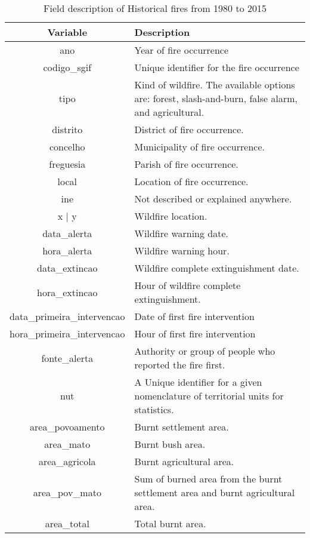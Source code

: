\begin{table}[h!]
\caption{Field description of Historical fires from 1980 to 2015}
\label{forest_inventory}
\centering
\small
\begin{tabular}{|c|p{7.5cm}|} %
\hline
\textbf{Variable} & \textbf{Description}\\
\hline
ano  & Year of fire occurrence \\
\hline
codigo\_sgif & Unique identifier for the fire occurrence \\
\hline
tipo  & Kind of wildfire. The available options are: forest, slash-and-burn, false alarm, and agricultural.\\
\hline
distrito  & District of fire occurrence. \\
\hline
concelho  & Municipality of fire occurrence. \\
\hline
freguesia  & Parish of fire occurrence.\\
\hline
local  & Location of fire occurrence. \\
\hline
ine  & Not described or explained anywhere. \\
\hline
x | y  & Wildfire location. \\
\hline
data\_alerta  & Wildfire warning date. \\
\hline
hora\_alerta  & Wildfire warning hour. \\
\hline
data\_extincao & Wildfire complete extinguishment date. \\
\hline
hora\_extincao & Hour of wildfire complete extinguishment. \\
\hline
data\_primeira\_intervencao & Date of first fire intervention \\
\hline
hora\_primeira\_intervencao & Hour of first fire intervention \\
\hline
fonte\_alerta & Authority or group of people who reported the fire first. \\
\hline
nut & A Unique identifier for a given nomenclature of territorial units for statistics. \\
\hline
area\_povoamento & Burnt settlement area. \\
\hline
area\_mato & Burnt bush area.  \\
\hline
area\_agricola & Burnt agricultural area. \\
\hline
area\_pov\_mato & Sum of burned area from the burnt settlement area and burnt agricultural area.\\
\hline
area\_total & Total burnt area. \\

\end{tabular}
\end{table}
